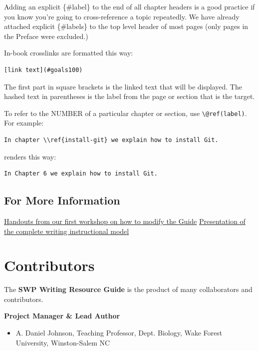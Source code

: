 \documentclass[
]{book}
\providecommand{\tightlist}{%
  \setlength{\itemsep}{0pt}\setlength{\parskip}{0pt}}
\begin{document}
Adding an explicit \{\#label\} to the end of all chapter headers is a good practice if you know you're going to cross-reference a topic repeatedly. We have already attached explicit \{\#labels\} to the top level header of most pages (only pages in the Preface were excluded.)

In-book crosslinks are formatted this way:

\begin{verbatim}
[link text](#goals100)
\end{verbatim}

The first part in square brackets is the linked text that will be displayed. The hashed text in parentheses is the label from the page or section that is the target.

To refer to the NUMBER of a particular chapter or section, use \texttt{\textbackslash{}@ref(label)}. For example:

\begin{verbatim}
In chapter \\ref{install-git} we explain how to install Git.
\end{verbatim}

renders this way:

\begin{verbatim}
In Chapter 6 we explain how to install Git.
\end{verbatim}

\hypertarget{for-more-information}{%
\section*{For More Information}\label{for-more-information}}

\href{https://github.com/adanieljohnson/ABLE_2022_Workshop}{Handouts from our first workshop on how to modify the Guide}
\href{}{Presentation of the complete writing instructional model}

\hypertarget{contributors}{%
\chapter*{Contributors}\label{contributors}}

The \textbf{SWP Writing Resource Guide} is the product of many collaborators and contributors.

\textbf{Project Manager \& Lead Author}

\begin{itemize}
\tightlist
\item
  A. Daniel Johnson, Teaching Professor, Dept. Biology, Wake Forest University, Winston-Salem NC
\end{itemize}
\end{document}
